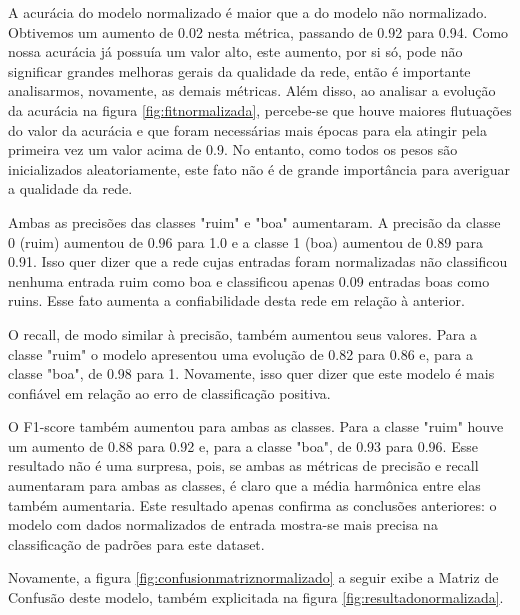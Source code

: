 \documentclass[12pt]{article}
\begin{document}
A acurácia do modelo normalizado é maior que a do modelo não normalizado. Obtivemos um aumento de 0.02 nesta métrica, passando de 0.92 para 0.94. Como nossa acurácia já possuía um valor alto, este aumento, por si só, pode não significar grandes melhoras gerais da qualidade da rede, então é importante analisarmos, novamente, as demais métricas. Além disso, ao analisar a evolução da acurácia na figura \ref{fig:fitnormalizada}, percebe-se que houve maiores flutuações do valor da acurácia e que foram necessárias mais épocas para ela atingir pela primeira vez um valor acima de 0.9. No entanto, como todos os pesos são inicializados aleatoriamente, este fato não é de grande importância para averiguar a qualidade da rede.

Ambas as precisões das classes "ruim" e "boa" aumentaram. A precisão da classe 0 (ruim) aumentou de 0.96 para 1.0 e a classe 1 (boa) aumentou de 0.89 para 0.91. Isso quer dizer que a rede cujas entradas foram normalizadas não classificou nenhuma entrada ruim como boa e classificou apenas 0.09 entradas boas como ruins. Esse fato aumenta a confiabilidade desta rede em relação à anterior.

O recall, de modo similar à precisão, também aumentou seus valores. Para a classe "ruim" o modelo apresentou uma evolução de 0.82 para 0.86 e, para a classe "boa", de 0.98 para 1. Novamente, isso quer dizer que este modelo é mais confiável em relação ao erro de classificação positiva.

O F1-score também aumentou para ambas as classes. Para a classe "ruim" houve um aumento de 0.88 para 0.92 e, para a classe "boa", de 0.93 para 0.96. Esse resultado não é uma surpresa, pois, se ambas as métricas de precisão e recall aumentaram para ambas as classes, é claro que a média harmônica entre elas também aumentaria. Este resultado apenas confirma as conclusões anteriores: o modelo com dados normalizados de entrada mostra-se mais precisa na classificação de padrões para este dataset.

Novamente, a figura \ref{fig:confusionmatriznormalizado} a seguir exibe a Matriz de Confusão deste modelo, também explicitada na figura \ref{fig:resultadonormalizada}.
\end{document}
